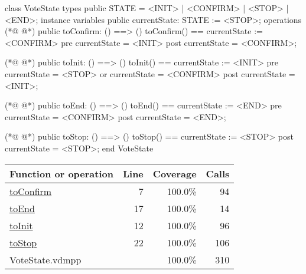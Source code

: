 \begin{vdmpp}
class VoteState
types
 public STATE = <INIT> | <CONFIRM> | <STOP> | <END>;
instance variables
 public currentState: STATE := <STOP>;
operations
(*@
\label{toConfirm:7}
@*)
 public toConfirm: () ==> ()
 toConfirm() == currentState := <CONFIRM>
 pre currentState = <INIT>
 post currentState = <CONFIRM>;
 
(*@
\label{toInit:12}
@*)
 public toInit: () ==> ()
 toInit() == currentState := <INIT>
 pre currentState = <STOP> or  currentState = <CONFIRM>
 post currentState = <INIT>;
 
(*@
\label{toEnd:17}
@*)
 public toEnd: () ==> ()
 toEnd() == currentState := <END>
 pre currentState = <CONFIRM>
 post currentState = <END>;
 
(*@
\label{toStop:22}
@*)
 public toStop: () ==> ()
 toStop() == currentState := <STOP>
 post currentState = <STOP>;
end VoteState
\end{vdmpp}
\bigskip
\begin{longtable}{|l|r|r|r|}
\hline
Function or operation & Line & Coverage & Calls \\
\hline
\hline
\hyperref[toConfirm:7]{toConfirm} & 7&100.0\% & 94 \\
\hline
\hyperref[toEnd:17]{toEnd} & 17&100.0\% & 14 \\
\hline
\hyperref[toInit:12]{toInit} & 12&100.0\% & 96 \\
\hline
\hyperref[toStop:22]{toStop} & 22&100.0\% & 106 \\
\hline
\hline
VoteState.vdmpp & & 100.0\% & 310 \\
\hline
\end{longtable}

